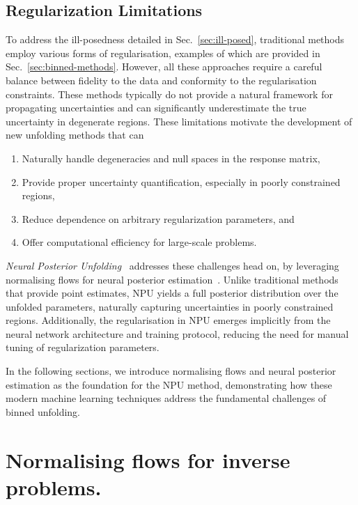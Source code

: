 \subsection{Regularization Limitations}
    To address the ill-posedness detailed in Sec.~\ref{sec:ill-posed}, traditional methods employ various forms of regularisation, examples of which are provided in Sec.~\ref{sec:binned-methods}.
    However, all these approaches require a careful balance between fidelity to the data and conformity to the regularisation constraints.
    These methods typically do not provide a natural framework for propagating uncertainties and can significantly underestimate the true uncertainty in degenerate regions.
    These limitations motivate the development of new unfolding methods that can
    \begin{enumerate}
        \item Naturally handle degeneracies and null spaces in the response matrix,
        \item Provide proper uncertainty quantification, especially in poorly constrained regions,
        \item Reduce dependence on arbitrary regularization parameters, and
        \item Offer computational efficiency for large-scale problems.
    \end{enumerate}
    \emph{Neural Posterior Unfolding}~\cite{acosta2024npu} addresses these challenges head on, by leveraging normalising flows for neural posterior estimation~\cite{Papamakarios2016FastEstimation}.
    Unlike traditional methods that provide point estimates, NPU yields a full posterior distribution over the unfolded parameters, naturally capturing uncertainties in poorly constrained regions. 
    Additionally, the regularisation in NPU emerges implicitly from the neural network architecture and training protocol, reducing the need for manual tuning of regularization parameters.

    In the following sections, we introduce normalising flows and neural posterior estimation as the foundation for the NPU method, demonstrating how these modern machine learning techniques address the fundamental challenges of binned unfolding.
\section{Normalising flows for inverse problems.}

